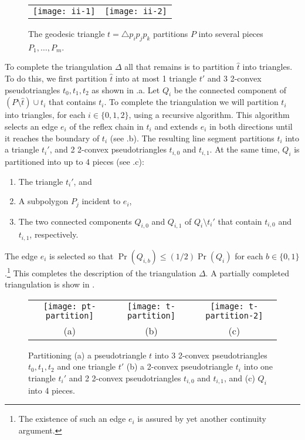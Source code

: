 \documentclass[lotsofwhite]{patmorin}
\newcommand{\z}[1]{{\hat{#1}}}
\begin{document}
\begin{figure}
  \begin{center}
    \begin{tabular}{cc}
      \texttt{[image: ii-1]} & \texttt{[image: ii-2]} 
    \end{tabular}
  \end{center}
  \caption{The geodesic triangle $t=\triangle p_i p_j p_k$ partitions $P$ into several
pieces $P_1,\ldots,P_m$.}
\end{figure}


To complete the triangulation $\Delta$ all that remains is to
partition $\z t$ into triangles.  To do this, we first
partition $\z t$ into at most 1 triangle $t'$ and 3 2-convex
pseudotriangles $t_0,t_1,t_2$ as shown in .a. Let
$Q_i$ be the connected component of $(P\setminus \z t)\cup t_i$ that
contains $t_i$.  To complete the triangulation we will partition
$t_i$ into triangles, for each $i\in\{0,1,2\}$, using a recursive
algorithm.  This algorithm selects an edge $e_i$ of the reflex chain
in $t_i$ and
extends $e_i$ in both directions until it reaches the boundary of $t_i$
(see .b).  The resulting line segment partitions
$t_i$ into a triangle $t_i'$, and 2 2-convex pseudotriangles $t_{i,0}$
and
$t_{i,1}$.  At the same time, $Q_i$ is partitioned into up to 4 pieces
(see .c):
\begin{enumerate}
\item The triangle $t_i'$, and
\item A subpolygon $P_j$ incident to $e_i$,
\item The two connected components $Q_{i,0}$
and $Q_{i,1}$ of $Q_i\setminus t_i'$ that contain $t_{i,0}$ and
$t_{i,1}$, respectively.
\end{enumerate}
The edge $e_i$ is selected
so that $\Pr(Q_{i,b})\le (1/2)\Pr(Q_i)$ for each
$b\in\{0,1\}$.\footnote{The existence of such an edge $e_i$ is assured
by yet another continuity argument.}  This
completes the description of the triangulation $\Delta$.  A partially
completed triangulation is show in .

\begin{figure}
  \begin{center}
    \begin{tabular}{ccc}
      \texttt{[image: pt-partition]} & 
      \texttt{[image: t-partition]} &
      \texttt{[image: t-partition-2]} \\
      (a) & (b) & (c)
    \end{tabular}
  \end{center}
  \caption{Partitioning (a) a pseudotriangle $t$ into 3 2-convex
pseudotriangles $t_0,t_1,t_2$ and one triangle $t'$ (b) a 2-convex
pseudotriangle $t_i$ into one triangle $t_i'$ and 2 2-convex
pseudotriangles $t_{i,0}$ and $t_{i,1}$, and (c) $Q_i$ into 4 pieces.}
\end{figure}
\end{document}
